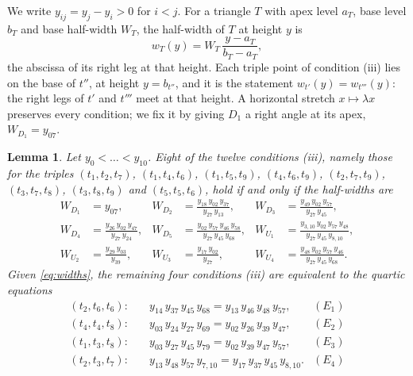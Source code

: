 \documentclass[11pt,a4paper]{article}
\newtheorem{lemma}[theorem]{Lemma}
\theoremstyle{definition}
\theoremstyle{remark}
\newcommand{\yy}[2]{y_{#1#2}}
\begin{document}
We write $\yy{i}{j} = y_j - y_i > 0$ for $i < j$. For a triangle $T$ with apex level $a_T$, base level
$b_T$ and base half-width $W_T$, the half-width of $T$ at height $y$ is
\[
  w_T(y) = W_T\,\frac{y - a_T}{b_T - a_T},
\]
the abscissa of its right leg at that height. Each triple point of condition (iii) lies on the base of
$t''$, at height $y = b_{t''}$, and it is the statement $w_{t'}(y) = w_{t'''}(y)$: the right legs of
$t'$ and $t'''$ meet at that height. A horizontal stretch $x \mapsto \lambda x$ preserves every
condition; we fix it by giving $D_1$ a right angle at its apex, $W_{D_1} = \yy{0}{7}$.

\begin{lemma}\label{lem:widths}
Let $y_0 < \dots < y_{10}$. Eight of the twelve conditions (iii), namely those for the triples
$(t_1,t_2,t_7)$, $(t_1,t_4,t_6)$, $(t_1,t_5,t_9)$, $(t_4,t_6,t_9)$, $(t_2,t_7,t_9)$, $(t_3,t_7,t_8)$,
$(t_3,t_8,t_9)$ and $(t_5,t_5,t_6)$, hold if and only if the half-widths are
\begin{equation}\label{eq:widths}
\begin{aligned}
W_{D_1} &= \yy07, &
W_{D_2} &= \frac{\yy18\,\yy02\,\yy37}{\yy27\,\yy13}, &
W_{D_3} &= \frac{\yy49\,\yy02\,\yy57}{\yy27\,\yy45}, \\
W_{D_4} &= \frac{\yy26\,\yy02\,\yy47}{\yy27\,\yy24}, &
W_{D_5} &= \frac{\yy02\,\yy57\,\yy46\,\yy58}{\yy27\,\yy45\,\yy68}, &
W_{U_1} &= \frac{y_{3,10}\,\yy02\,\yy57\,\yy48}{\yy27\,\yy45\,y_{8,10}}, \\
W_{U_2} &= \frac{\yy29\,\yy03}{\yy39}, &
W_{U_3} &= \frac{\yy17\,\yy02}{\yy27}, &
W_{U_4} &= \frac{\yy48\,\yy02\,\yy57\,\yy46}{\yy27\,\yy45\,\yy68}.
\end{aligned}
\end{equation}
Given \eqref{eq:widths}, the remaining four conditions (iii) are equivalent to the quartic equations
\begin{align*}
(t_2,t_6,t_6):&\quad \yy14\,\yy37\,\yy45\,\yy68 = \yy13\,\yy46\,\yy48\,\yy57, & (E_1)\\
(t_4,t_4,t_8):&\quad \yy03\,\yy24\,\yy27\,\yy69 = \yy02\,\yy26\,\yy39\,\yy47, & (E_2)\\
(t_1,t_3,t_8):&\quad \yy03\,\yy27\,\yy45\,\yy79 = \yy02\,\yy39\,\yy47\,\yy57, & (E_3)\\
(t_2,t_3,t_7):&\quad \yy13\,\yy48\,\yy57\,y_{7,10} = \yy17\,\yy37\,\yy45\,y_{8,10}. & (E_4)
\end{align*}
\end{lemma}
\end{document}
